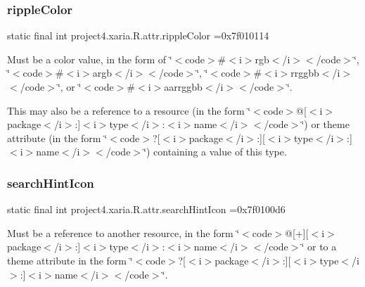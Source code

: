 \subsubsection{\texorpdfstring{ripple\+Color}{rippleColor}}
{\footnotesize\ttfamily static final int project4.\+xaria.\+R.\+attr.\+ripple\+Color =0x7f010114\hspace{0.3cm}{\ttfamily [static]}}

Must be a color value, in the form of \char`\"{}$<$code$>$\#$<$i$>$rgb$<$/i$>$$<$/code$>$\char`\"{}, \char`\"{}$<$code$>$\#$<$i$>$argb$<$/i$>$$<$/code$>$\char`\"{}, \char`\"{}$<$code$>$\#$<$i$>$rrggbb$<$/i$>$$<$/code$>$\char`\"{}, or \char`\"{}$<$code$>$\#$<$i$>$aarrggbb$<$/i$>$$<$/code$>$\char`\"{}. 

This may also be a reference to a resource (in the form \char`\"{}$<$code$>$@\mbox{[}$<$i$>$package$<$/i$>$\+:\mbox{]}$<$i$>$type$<$/i$>$\+:$<$i$>$name$<$/i$>$$<$/code$>$\char`\"{}) or theme attribute (in the form \char`\"{}$<$code$>$?\mbox{[}$<$i$>$package$<$/i$>$\+:\mbox{]}\mbox{[}$<$i$>$type$<$/i$>$\+:\mbox{]}$<$i$>$name$<$/i$>$$<$/code$>$\char`\"{}) containing a value of this type. \mbox{\label{classproject4_1_1xaria_1_1R_1_1attr_ac3a7e099da434adbc583aee83c803190}} 
\subsubsection{\texorpdfstring{search\+Hint\+Icon}{searchHintIcon}}
{\footnotesize\ttfamily static final int project4.\+xaria.\+R.\+attr.\+search\+Hint\+Icon =0x7f0100d6\hspace{0.3cm}{\ttfamily [static]}}

Must be a reference to another resource, in the form \char`\"{}$<$code$>$@\mbox{[}+\mbox{]}\mbox{[}$<$i$>$package$<$/i$>$\+:\mbox{]}$<$i$>$type$<$/i$>$\+:$<$i$>$name$<$/i$>$$<$/code$>$\char`\"{} or to a theme attribute in the form \char`\"{}$<$code$>$?\mbox{[}$<$i$>$package$<$/i$>$\+:\mbox{]}\mbox{[}$<$i$>$type$<$/i$>$\+:\mbox{]}$<$i$>$name$<$/i$>$$<$/code$>$\char`\"{}. \mbox{\label{classproject4_1_1xaria_1_1R_1_1attr_a36e8f448881a8401fd68fae83556158f}} 
